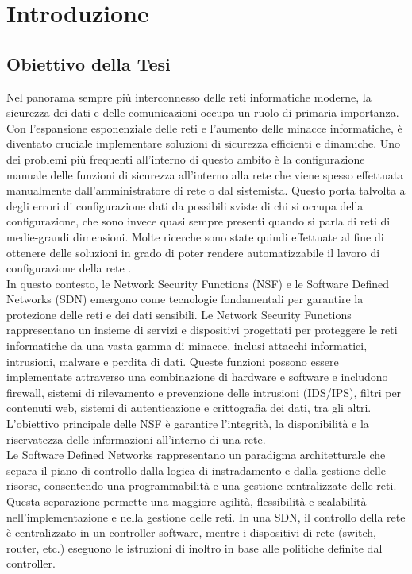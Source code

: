 

\hypersetup{
    colorlinks=true,
    linkcolor=blue
}

\chapter{Introduzione} \label{ch:intro}

\section{Obiettivo della Tesi} 

Nel panorama sempre più interconnesso delle reti informatiche moderne, la sicurezza dei dati e delle comunicazioni occupa un ruolo di primaria importanza. 
Con l'espansione esponenziale delle reti e l'aumento delle minacce informatiche, è diventato cruciale implementare soluzioni di sicurezza efficienti e dinamiche.
Uno dei problemi più frequenti all'interno di questo ambito è la configurazione manuale delle funzioni di sicurezza all'interno alla rete che viene spesso effettuata
manualmente dall'amministratore di rete o dal sistemista\cite{cit7}. Questo porta talvolta a degli errori di configurazione dati da possibili sviste di chi si occupa della configurazione,
che sono invece quasi sempre presenti quando si parla di reti di medie-grandi dimensioni.
Molte ricerche sono state quindi effettuate al fine di ottenere delle soluzioni in grado di poter rendere automatizzabile il lavoro di configurazione della rete \cite{cit1}. \\

In questo contesto, le Network Security Functions (NSF) e le Software Defined Networks (SDN) emergono come tecnologie fondamentali per garantire la protezione delle reti e dei dati sensibili.
Le Network Security Functions rappresentano un insieme di servizi e dispositivi progettati per proteggere le reti informatiche da una vasta gamma di minacce, inclusi attacchi informatici, intrusioni, malware e perdita di dati.
Queste funzioni possono essere implementate attraverso una combinazione di hardware e software e includono firewall, sistemi di rilevamento e prevenzione delle intrusioni (IDS/IPS), filtri per contenuti web, sistemi di autenticazione e crittografia dei dati, tra gli altri. 
L'obiettivo principale delle NSF è garantire l'integrità, la disponibilità e la riservatezza delle informazioni all'interno di una rete.\\

Le Software Defined Networks rappresentano un paradigma architetturale che separa il piano di controllo dalla logica di instradamento e dalla gestione delle risorse, consentendo una programmabilità e una gestione centralizzate delle reti. 
Questa separazione permette una maggiore agilità, flessibilità e scalabilità nell'implementazione e nella gestione delle reti. In una SDN, il controllo della rete è centralizzato in un controller software, mentre i dispositivi di rete (switch, router, etc.) eseguono le istruzioni di inoltro in base alle politiche definite dal controller.\\

